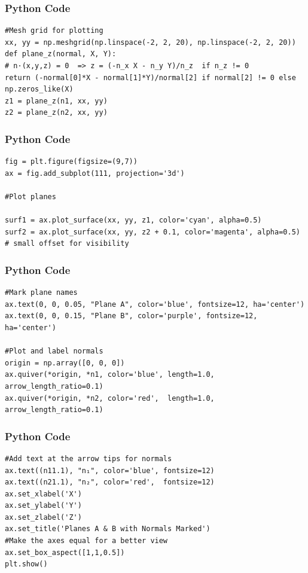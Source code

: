 \documentclass{beamer}
\begin{document}
\begin{frame}[fragile]
    \frametitle{Python Code}

    \begin{lstlisting}
#Mesh grid for plotting
xx, yy = np.meshgrid(np.linspace(-2, 2, 20), np.linspace(-2, 2, 20))
def plane_z(normal, X, Y):
# n·(x,y,z) = 0  => z = (-n_x X - n_y Y)/n_z  if n_z != 0
return (-normal[0]*X - normal[1]*Y)/normal[2] if normal[2] != 0 else np.zeros_like(X)
z1 = plane_z(n1, xx, yy)
z2 = plane_z(n2, xx, yy)
    \end{lstlisting}
\end{frame}

\begin{frame}[fragile]
    \frametitle{Python Code}

    \begin{lstlisting}
fig = plt.figure(figsize=(9,7))
ax = fig.add_subplot(111, projection='3d')

#Plot planes

surf1 = ax.plot_surface(xx, yy, z1, color='cyan', alpha=0.5)
surf2 = ax.plot_surface(xx, yy, z2 + 0.1, color='magenta', alpha=0.5)  # small offset for visibility

\end{lstlisting}
\end{frame}

 
\begin{frame}[fragile]
    \frametitle{Python Code}

    \begin{lstlisting}
#Mark plane names
ax.text(0, 0, 0.05, "Plane A", color='blue', fontsize=12, ha='center')
ax.text(0, 0, 0.15, "Plane B", color='purple', fontsize=12, ha='center')

#Plot and label normals
origin = np.array([0, 0, 0])
ax.quiver(*origin, *n1, color='blue', length=1.0, arrow_length_ratio=0.1)
ax.quiver(*origin, *n2, color='red',  length=1.0, arrow_length_ratio=0.1)
\end{lstlisting}
\end{frame}
\begin{frame}[fragile]
    \frametitle{Python Code}

    \begin{lstlisting}
#Add text at the arrow tips for normals
ax.text((n11.1), "n₁", color='blue', fontsize=12)
ax.text((n21.1), "n₂", color='red',  fontsize=12)
ax.set_xlabel('X')
ax.set_ylabel('Y')
ax.set_zlabel('Z')
ax.set_title('Planes A & B with Normals Marked')
#Make the axes equal for a better view
ax.set_box_aspect([1,1,0.5])
plt.show()
\end{lstlisting}
\end{frame}
\end{document}
